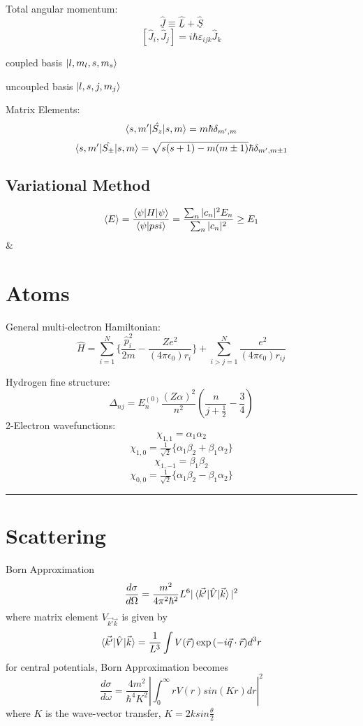 \documentclass[table,cmyk]{article}
\begin{document}
\begin{longtable}
{\begin{minipage}{7.4cm}
\end{minipage}
}
\vspace{0.3cm}

Total angular momentum:
\[ \hat{\underline{J}} \equiv \hat{\underline{L}}+\hat{\underline{S}}\]
\[[\hat{J}_i,\hat{J}_j] = i\hbar \varepsilon_{ijk}\hat{J}_k\]
\begin{center}
{\centering

coupled basis $\ket{l, m_l, s, m_s}$ 

uncoupled basis $\ket{l, s, j, m_j}$}
\end{center}{}

Matrix Elements:
\[\braket{s,m'|\hat{S_z}|s,m} = m\hbar \delta_{m',m}\]
\[\braket{s,m'|\hat{S_{\pm}}|s,m} = \sqrt{s(s+1)-m(m\pm1)} \hbar \delta_{m',m\pm1}\]
\subsection*{Variational Method}
\[\langle E\rangle = \frac{\braket{\psi|H|\psi}}{\braket{\psi|psi}} = \frac{\sum_{n }|c_n|^2E_n}{\sum_{n }|c_n|^2} \ge E_1\]
&
\section*{Atoms}


General multi-electron Hamiltonian:
\[\hat{H} = \sum_{i=1}^{N} \Big\{ \frac{\hat{p}_i^2}{2m}-\frac{Ze^2}{(4\pi\epsilon_0)r_i}\Big\} + \sum_{i>j=1}^{N} \frac{e^2}{(4\pi\epsilon_0)r_{ij}}\]

Hydrogen fine structure:
\[\Delta_{nj} = E^{(0)}_n \frac{(Z\alpha)^2}{n^2}\left( \frac{n}{j+\tfrac{1}{2}}-\frac{3}{4}\right)\]
2-Electron wavefunctions:
\[\chi_{1,1} = \alpha_1\alpha_2\]
\[\chi_{1,0} = \tfrac{1}{\sqrt{2}}\{\alpha_1\beta_2+\beta_1\alpha_2\}\]
\[\chi_{1,-1} = \beta_1\beta_2\]
\[\chi_{0,0} = \tfrac{1}{\sqrt{2}}\{\alpha_1\beta_2-\beta_1\alpha_2\}\]
\noindent\rule{7.8cm}{0.4pt}

\section*{Scattering}
Born Approximation
\[\frac{d \sigma}{d \Omega} =\frac{m^2}{4\pi^2\hbar^2}L^6|\braket{\vec{k'}|\hat{V}|\vec{k}}|^2\]
where matrix element $V_{\vec{k'}\vec{k}}$ is given by
\[\braket{\vec{k'}|\hat{V}|\vec{k}} = \frac{1}{L^3}\int V(\vec{r})\exp{(-i\vec{q}\cdot \vec{r})}d^3r\]
for central potentials, Born Approximation becomes
\[\frac{d\sigma}{d\omega} = \frac{4m^2}{\hbar^4K^2}\left|\int_{0}^{\infty} rV(r)sin(Kr)dr\right|^2\]
where $K$ is the wave-vector transfer, $K = 2ksin\frac{\theta}{2}$
\tabularnewline\hline

\end{longtable}
\end{document}
